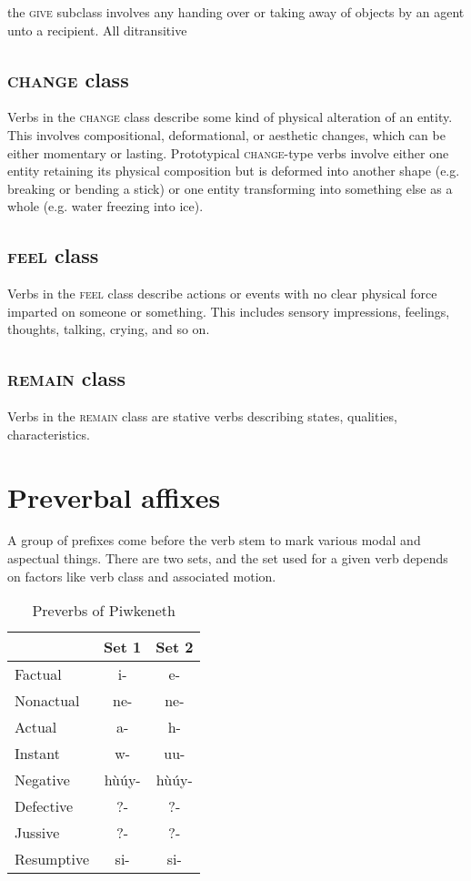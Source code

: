 \documentclass[smallroyalvopaper,9pt]{memoir}
\newcommand{\lang}{Piwkeneth}
\begin{document}
the \textsc{give} subclass involves any handing over or taking away of objects by an agent unto a recipient. All ditransitive

\subsection{\textsc{change} class}

Verbs in the \textsc{change} class describe some kind of physical alteration of an entity. This involves compositional, deformational, or aesthetic changes, which can be either momentary or lasting. Prototypical \textsc{change}-type verbs involve either one entity retaining its physical composition but is deformed into another shape (e.g. breaking or bending a stick) or one entity transforming into something else as a whole (e.g. water freezing into ice).

\subsection{\textsc{feel} class}

Verbs in the \textsc{feel} class describe actions or events with no clear physical force imparted on someone or something. This includes sensory impressions, feelings, thoughts, talking, crying, and so on.

\subsection{\textsc{remain} class}

Verbs in the \textsc{remain} class are stative verbs describing states, qualities, characteristics.

\section{Preverbal affixes}

A group of prefixes come before the verb stem to mark various modal and aspectual things. There are two sets, and the set used for a given verb depends on factors like verb class and associated motion.

\begin{table}[ht]
    \centering
    \begin{tabular}{lcc}
        \toprule
                   & Set 1  & Set 2 \\
        \midrule
        Factual    & i-     & e- \\
        Nonactual  & ne-    & ne- \\
        Actual     & a-     & h- \\
        Instant    & w-     & uu- \\
        Negative   & hùúy-  & hùúy- \\
        Defective  & ?-     & ?- \\
        Jussive    & ?-     & ?- \\
        Resumptive & si-    & si- \\
        \bottomrule
    \end{tabular}
    \caption{Preverbs of \lang}
\end{table}
\end{document}
